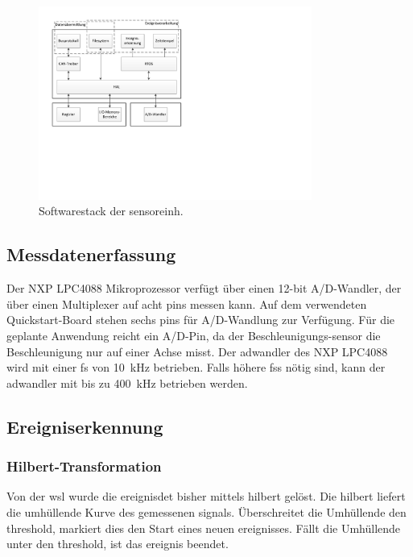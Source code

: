 \begin{figure}
	\centering
		\includegraphics[width=0.8\textwidth]{images/visio/Softwarestack_Sensor.pdf}
	\caption{Softwarestack der \gls{sensoreinh}.}
	\label{fig.sw_sensor}
\end{figure}



\subsection{Messdatenerfassung}\label{subsec.sw_messen}
Der NXP LPC4088 Mikroprozessor verfügt über einen 12-bit A/D-Wandler, der über einen Multiplexer auf acht \glspl{pin} messen kann. Auf dem verwendeten Quickstart-Board stehen sechs \glspl{pin} für A/D-Wandlung zur Verfügung. Für die geplante Anwendung reicht ein A/D-Pin, da der Beschleunigungs-\gls{sensor} die Beschleunigung nur auf einer Achse misst. Der \gls{adwandler} des NXP LPC4088 wird mit einer \gls{fs} von 10~kHz betrieben. Falls höhere \glspl{fs} nötig sind, kann der \gls{adwandler} mit bis zu 400~kHz betrieben werden.



\subsection{Ereigniserkennung}\label{subsec.sw_ereignis}
\subsubsection{Hilbert-Transformation}
Von der \gls{wsl} wurde die \gls{ereignisdet} bisher mittels \gls{hilbert} gelöst. Die \gls{hilbert} liefert die umhüllende Kurve des gemessenen \gls{signal}s. Überschreitet die Umhüllende den \gls{threshold}, markiert dies den Start eines neuen \gls{ereignis}ses. Fällt die Umhüllende unter den \gls{threshold}, ist das \gls{ereignis} beendet.

